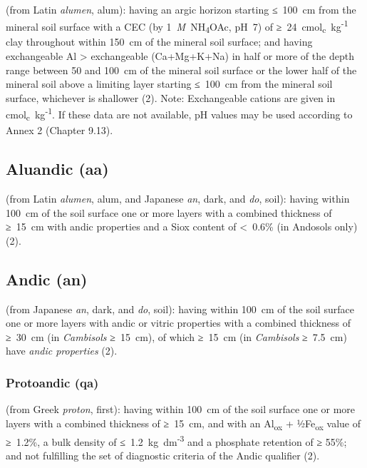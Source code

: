 \documentclass[
  letterpaper,
  DIV=11,
  numbers=noendperiod]{scrreprt}
\begin{document}
(from Latin \emph{alumen}, alum): having an argic horizon starting
≤~100~cm from the mineral soil surface with a CEC (by
1~\emph{M}~NH\textsubscript{4}OAc, pH~7) of
≥~24~cmol\textsubscript{c}~kg\textsuperscript{-1} clay throughout within
150~cm of the mineral soil surface; and having exchangeable Al
\textgreater{} exchangeable (Ca+Mg+K+Na) in half or more of the depth
range between 50 and 100~cm of the mineral soil surface or the lower
half of the mineral soil above a limiting layer starting ≤~100~cm from
the mineral soil surface, whichever is shallower (2). Note: Exchangeable
cations are given in cmol\textsubscript{c}~kg\textsuperscript{-1}. If
these data are not available, pH values may be used according to Annex 2
(Chapter 9.13).

\hypertarget{aluandic-aa}{%
\subsection{Aluandic (aa)}\label{aluandic-aa}}

(from Latin \emph{alumen}, alum, and Japanese \emph{an}, dark, and
\emph{do}, soil): having within 100~cm of the soil surface one or more
layers with a combined thickness of ≥~15~cm with andic properties and a
Siox content of \textless~0.6\% (in Andosols only) (2).

\hypertarget{andic-an}{%
\subsection{Andic (an)}\label{andic-an}}

(from Japanese \emph{an}, dark, and \emph{do}, soil): having within
100~cm of the soil surface one or more layers with andic or vitric
properties with a combined thickness of ≥~30~cm (in \emph{Cambisols}
≥~15~cm), of which ≥~15~cm (in \emph{Cambisols} ≥~7.5~cm) have
\emph{andic properties} (2).

\hypertarget{protoandic-qa}{%
\subsubsection{Protoandic (qa)}\label{protoandic-qa}}

(from Greek \emph{proton}, first): having within 100~cm of the soil
surface one or more layers with a combined thickness of ≥~15~cm, and
with an Al\textsubscript{ox} + ½Fe\textsubscript{ox} value of ≥~1.2\%, a
bulk density of ≤~1.2~kg~dm\textsuperscript{-3} and a phosphate
retention of ≥ 55\%; and not fulfilling the set of diagnostic criteria
of the Andic qualifier (2).
\end{document}
